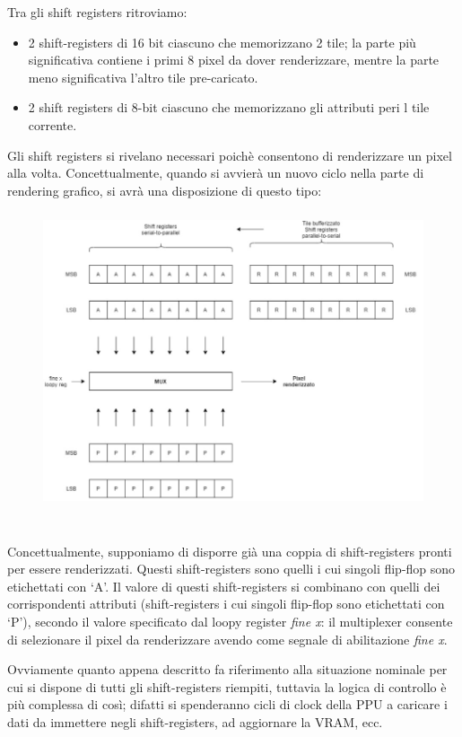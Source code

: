 \documentclass[11pt]{article}
\begin{document}
Tra gli shift registers ritroviamo:
\begin{itemize}
	\item{
	2 shift-registers di 16 bit ciascuno che memorizzano 2 tile; la parte più significativa contiene i primi 8 pixel da dover renderizzare, mentre la parte meno significativa l'altro tile pre-caricato.
	}
	\item{
	2 shift registers di 8-bit ciascuno che memorizzano gli attributi peri l tile corrente.
	}
\end{itemize}
\clearpage
Gli shift registers si rivelano necessari poichè consentono di renderizzare un pixel alla volta. Concettualmente, quando si avvierà un nuovo ciclo nella parte di rendering grafico, si avrà una disposizione di questo tipo:
\begin{figure}[h]
\hspace*{-1.2cm}
\centering
\includegraphics[width=450px, height=330px]{PIXEL_RENDERING_LOGIC.png}
\end{figure}\\
Concettualmente, supponiamo di disporre già una coppia di shift-registers pronti per essere renderizzati. Questi shift-registers sono quelli i cui singoli flip-flop sono etichettati con `A'. Il valore di questi shift-registers si combinano con quelli dei corrispondenti attributi (shift-registers i cui singoli flip-flop sono etichettati con `P'), secondo il valore specificato dal loopy register \emph{fine x}: il multiplexer consente di selezionare il pixel da renderizzare avendo come segnale di abilitazione \emph{fine x}. 

Ovviamente quanto appena descritto fa riferimento alla situazione nominale per cui si dispone di tutti gli shift-registers riempiti, tuttavia la logica di controllo è più complessa di così; difatti si spenderanno cicli di clock della PPU a caricare i dati da immettere negli shift-registers, ad aggiornare la VRAM, ecc.
\end{document}
